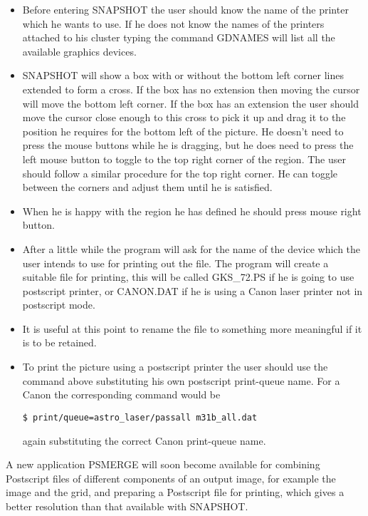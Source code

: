 \begin{itemize}
\item Before entering SNAPSHOT the user should know the name of the printer
which he wants to use. If he does not know the names of the printers attached
to his cluster typing the command GDNAMES will list all the available graphics 
devices.
\item SNAPSHOT will show a box with or without the bottom left corner lines
extended to form a cross. If the box has no extension then moving the cursor
will move the bottom left corner. If the box has an extension the user should
move the cursor close enough to this cross to pick it up and drag it to
the position he requires for the bottom left of the picture. He doesn't need
to press the mouse buttons while he is dragging, but he does need to press the
left mouse button to toggle to the top right corner of the 
region. The user should follow a similar procedure for the top right corner.
He can toggle between the corners and adjust them until he is satisfied.
\item When he is happy with the region he has defined he should press 
mouse right button.
\item After a little while the program will ask for the name of the device
which the user intends to use for printing out the file. The program will
create a suitable file for printing, this will be called GKS\_72.PS if he is
going to use postscript printer, or CANON.DAT if he is using a Canon laser
printer not in postscript mode.
\item It is useful at this point to rename the file to something more 
meaningful if it is to be retained.
\item To print the picture using a postscript printer the user should use the 
command above substituting his own postscript print-queue name. For a Canon
the corresponding command would be
\begin{small}
\begin{verbatim}
$ print/queue=astro_laser/passall m31b_all.dat
\end{verbatim}
\end{small}
again substituting the correct Canon print-queue name.
\end{itemize}

A new application PSMERGE will soon become available for combining Postscript
files of different components of an output image, for example the image and
the grid, and preparing a Postscript file for printing, which gives a better
resolution than that available with SNAPSHOT.

